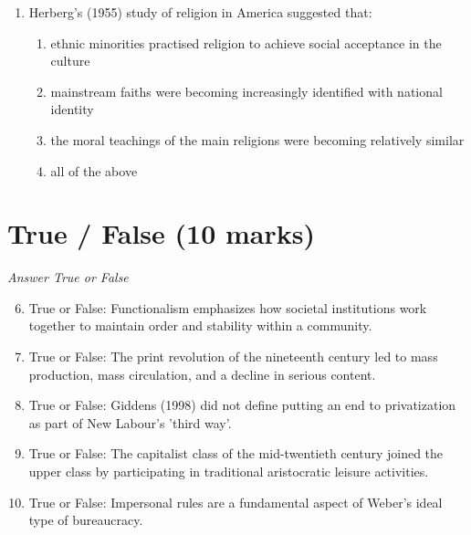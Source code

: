 \documentclass[12pt]{article}
\begin{document}
\begin{enumerate}[label=\arabic*.]
\begin{enumerate}[label=(\alph*)]
    \item the most commonly used recreational drug is Ecstasy
    \item teenage girls are more likely to experiment with hard drugs than teenage boys
    \item despite a series of moral panics, the use of illegal drugs is very rare
\end{enumerate}
\item Herberg's (1955) study of religion in America suggested that:
\begin{enumerate}[label=(\alph*)]
    \item ethnic minorities practised religion to achieve social acceptance in the culture
    \item mainstream faiths were becoming increasingly identified with national identity
    \item the moral teachings of the main religions were becoming relatively similar
    \item all of the above
\end{enumerate}
\end{enumerate}

\section*{True / False (10 marks)}
\textit{Answer True or False}
\begin{enumerate}[label=\arabic*.]
\setcounter{enumi}{5}
\item True or False: Functionalism emphasizes how societal institutions work together to maintain order and stability within a community.
\item True or False: The print revolution of the nineteenth century led to mass production, mass circulation, and a decline in serious content.
\item True or False: Giddens (1998) did not define putting an end to privatization as part of New Labour's 'third way'.
\item True or False: The capitalist class of the mid-twentieth century joined the upper class by participating in traditional aristocratic leisure activities.
\item True or False: Impersonal rules are a fundamental aspect of Weber's ideal type of bureaucracy.
\end{enumerate}
\end{document}
